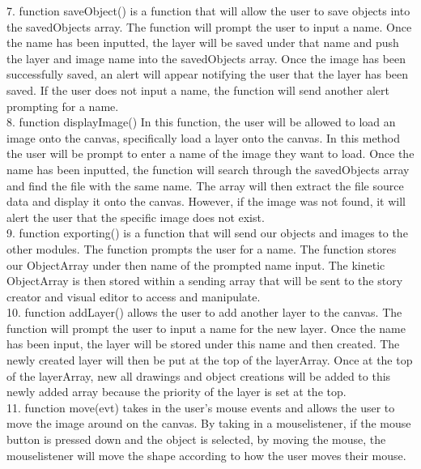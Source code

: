 \documentclass[a4paper, 11pt]{article} %
\begin{document}
7.	function saveObject() is a function that will allow the user to save objects into the savedObjects array. The function will prompt the user to input a name. Once the name has been inputted, the layer will be saved under that name and push the layer and image name into the savedObjects array. Once the image has been successfully saved, an alert will appear notifying the user that the layer has been saved. If the user does not input a name, the function will send another alert prompting for a name. \\

8.	function displayImage() In this function, the user will be allowed to load an image onto the canvas, specifically load a layer onto the canvas. In this method the user will be prompt to enter a name of the image they want to load. Once the name has been inputted, the function will search through the savedObjects array and find the file with the same name. The array will then extract the file source data and display it onto the canvas. However, if the image was not found, it will alert the user that the specific image does not exist.\\

9.	function exporting() is a function that will send our objects and images to the other modules. The function prompts the user for a name. The function stores our ObjectArray under then name of the prompted name input. The kinetic ObjectArray is then stored within a sending array that will be sent to the story creator and visual editor to access and manipulate.\\

10.	function addLayer() allows the user to add another layer to the canvas. The function will prompt the user to input a name for the new layer. Once the name has been input, the layer will be stored under this name and then created. The newly created layer will then be put at the top of the layerArray. Once at the top of the layerArray, new all drawings and object creations will be added to this newly added array because the priority of the layer is set at the top.  \\

11.	function move(evt) takes in the user’s mouse events and allows the user to move the image around on the canvas. By taking in a mouselistener, if the mouse button is pressed down and the object is selected, by moving the mouse, the mouselistener will move the shape according to how the user moves their mouse. \\
\end{document}
